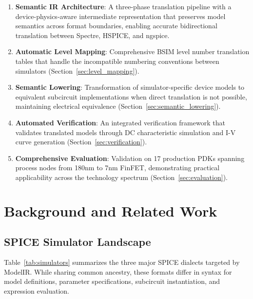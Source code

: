 \documentclass[conference]{IEEEtran}
\begin{document}
\begin{enumerate}
    \item \textbf{Semantic IR Architecture}: A three-phase translation pipeline with a device-physics-aware intermediate representation that preserves model semantics across format boundaries, enabling accurate bidirectional translation between Spectre, HSPICE, and ngspice.
    
    \item \textbf{Automatic Level Mapping}: Comprehensive BSIM level number translation tables that handle the incompatible numbering conventions between simulators (Section~\ref{sec:level_mapping}).
    
    \item \textbf{Semantic Lowering}: Transformation of simulator-specific device models to equivalent subcircuit implementations when direct translation is not possible, maintaining electrical equivalence (Section~\ref{sec:semantic_lowering}).
    
    \item \textbf{Automated Verification}: An integrated verification framework that validates translated models through DC characteristic simulation and I-V curve generation (Section~\ref{sec:verification}).
    
    \item \textbf{Comprehensive Evaluation}: Validation on 17 production PDKs spanning process nodes from 180nm to 7nm FinFET, demonstrating practical applicability across the technology spectrum (Section~\ref{sec:evaluation}).
\end{enumerate}

\section{Background and Related Work}
\label{sec:background}

\subsection{SPICE Simulator Landscape}

Table~\ref{tab:simulators} summarizes the three major SPICE dialects targeted by ModelIR. While sharing common ancestry, these formats differ in syntax for model definitions, parameter specifications, subcircuit instantiation, and expression evaluation.
\end{document}
